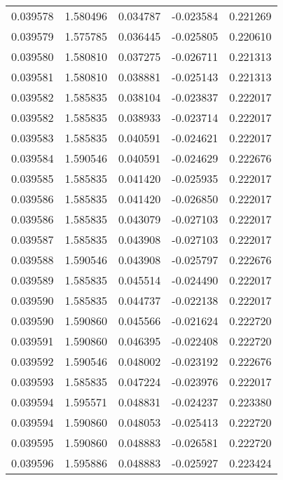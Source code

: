 \begin{tabular}{lrrrr}
0.039578    &  1.580496 &  0.034787 & -0.023584 &             0.221269 \\
0.039579    &  1.575785 &  0.036445 & -0.025805 &             0.220610 \\
0.039580    &  1.580810 &  0.037275 & -0.026711 &             0.221313 \\
0.039581    &  1.580810 &  0.038881 & -0.025143 &             0.221313 \\
0.039582    &  1.585835 &  0.038104 & -0.023837 &             0.222017 \\
0.039582    &  1.585835 &  0.038933 & -0.023714 &             0.222017 \\
0.039583    &  1.585835 &  0.040591 & -0.024621 &             0.222017 \\
0.039584    &  1.590546 &  0.040591 & -0.024629 &             0.222676 \\
0.039585    &  1.585835 &  0.041420 & -0.025935 &             0.222017 \\
0.039586    &  1.585835 &  0.041420 & -0.026850 &             0.222017 \\
0.039586    &  1.585835 &  0.043079 & -0.027103 &             0.222017 \\
0.039587    &  1.585835 &  0.043908 & -0.027103 &             0.222017 \\
0.039588    &  1.590546 &  0.043908 & -0.025797 &             0.222676 \\
0.039589    &  1.585835 &  0.045514 & -0.024490 &             0.222017 \\
0.039590    &  1.585835 &  0.044737 & -0.022138 &             0.222017 \\
0.039590    &  1.590860 &  0.045566 & -0.021624 &             0.222720 \\
0.039591    &  1.590860 &  0.046395 & -0.022408 &             0.222720 \\
0.039592    &  1.590546 &  0.048002 & -0.023192 &             0.222676 \\
0.039593    &  1.585835 &  0.047224 & -0.023976 &             0.222017 \\
0.039594    &  1.595571 &  0.048831 & -0.024237 &             0.223380 \\
0.039594    &  1.590860 &  0.048053 & -0.025413 &             0.222720 \\
0.039595    &  1.590860 &  0.048883 & -0.026581 &             0.222720 \\
0.039596    &  1.595886 &  0.048883 & -0.025927 &             0.223424 \\

\end{tabular}
